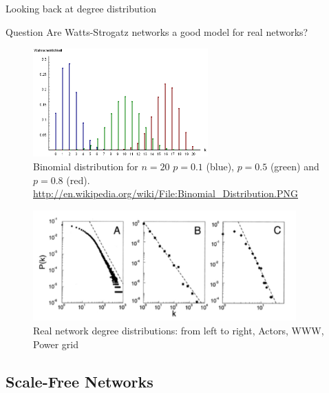 \begin{frame}{Looking back at degree distribution}

\begin{block}{Question}
Are Watts-Strogatz networks a good model for real networks?
\end{block}

\begin{overprint}

\begin{figure}
	\includegraphics[width=0.6\textwidth]{binomial}
	\caption{Binomial distribution for $n = 20$
$p = 0.1$ (blue), $p = 0.5$ (green) and $p = 0.8$ (red).
{\scriptsize \url{http://en.wikipedia.org/wiki/File:Binomial_Distribution.PNG}}
}
\end{figure}


\begin{figure}
	\includegraphics[width=0.9\textwidth]{threeex}
	\caption{Real network degree distributions: from left to right, Actors, WWW, Power grid}
\end{figure}
	
\end{overprint}
	
\end{frame}

\subsection{Scale-Free Networks}

